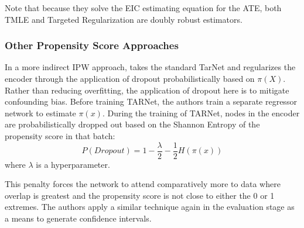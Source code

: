 Note that because they solve the EIC estimating equation for the ATE, both TMLE and Targeted Regularization are doubly robust estimators.

\subsubsection{Other Propensity Score Approaches}

In a more indirect IPW approach, \citet{Alaa2017} takes the standard TarNet and regularizes the encoder through the application of dropout probabilistically based on $\pi(X)$. Rather than reducing overfitting, the application of dropout here is to mitigate confounding bias.  Before training TARNet, the authors train a separate regressor network to estimate $\pi(x)$. During the training of TARNet, nodes in the encoder are probabilistically dropped out based on the Shannon Entropy of the propensity score in that batch:
\begin{equation}
P(Dropout)= 1 - \frac{\lambda}{2}-\frac{1}{2}H(\pi(x))
\end{equation}
where $\lambda$ is a hyperparameter.

This penalty forces the network to attend comparatively more to data where overlap is greatest and the propensity score is not close to either the 0 or 1 extremes. The authors apply a similar technique again in the evaluation stage as a means to generate confidence intervals.
\fi
